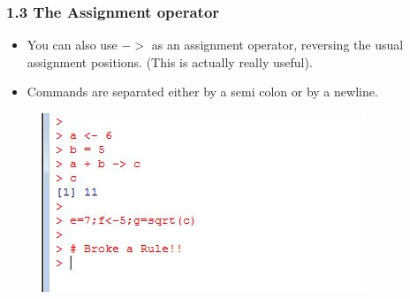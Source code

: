 \documentclass{beamer}
\begin{document}
 	\begin{frame}
 		\frametitle{1.3 The Assignment operator}
 		\begin{itemize}
 		\item You can also use $->$ as an assignment operator, reversing the
 		usual assignment positions. (This is actually really useful).
 		\item Commands are separated either by
 		a semi colon or by a newline.
 		\end{itemize}
 		\begin{figure}
 			\centering
 			\includegraphics[width=1.2\linewidth]{images/assignment}
 		\end{figure}
 		
 	\end{frame}
 	
\end{document}
